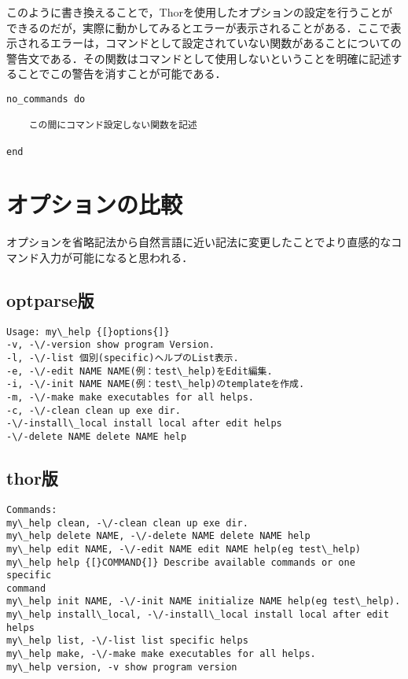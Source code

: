 このように書き換えることで，Thorを使用したオプションの設定を行うことができるのだが，実際に動かしてみるとエラーが表示されることがある．ここで表示されるエラーは，コマンドとして設定されていない関数があることについての警告文である．その関数はコマンドとして使用しないということを明確に記述することでこの警告を消すことが可能である．

\begin{screen}
{\small
\begin{verbatim}
no_commands do

    この間にコマンド設定しない関数を記述

end
\end{verbatim}}
\end{screen}

\section{オプションの比較}\label{ux30aaux30d7ux30b7ux30e7ux30f3ux306eux6bd4ux8f03}

オプションを省略記法から自然言語に近い記法に変更したことでより直感的なコマンド入力が可能になると思われる．

\subsection{optparse版}\label{optparseux7248}

\begin{screen}
{\small
\begin{verbatim}
Usage: my\_help {[}options{]}
-v, -\/-version show program Version.
-l, -\/-list 個別(specific)ヘルプのList表示.
-e, -\/-edit NAME NAME(例：test\_help)をEdit編集.
-i, -\/-init NAME NAME(例：test\_help)のtemplateを作成.
-m, -\/-make make executables for all helps.
-c, -\/-clean clean up exe dir.
-\/-install\_local install local after edit helps
-\/-delete NAME delete NAME help
\end{verbatim}}
\end{screen}

\subsection{thor版}\label{thorux7248}

\begin{screen}
{\small
\begin{verbatim}
Commands:
my\_help clean, -\/-clean clean up exe dir.
my\_help delete NAME, -\/-delete NAME delete NAME help
my\_help edit NAME, -\/-edit NAME edit NAME help(eg test\_help)
my\_help help {[}COMMAND{]} Describe available commands or one specific
command
my\_help init NAME, -\/-init NAME initialize NAME help(eg test\_help).
my\_help install\_local, -\/-install\_local install local after edit
helps
my\_help list, -\/-list list specific helps
my\_help make, -\/-make make executables for all helps.
my\_help version, -v show program version
\end{verbatim}}
\end{screen}
    